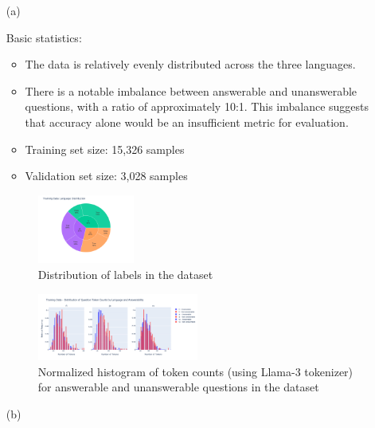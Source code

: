 \documentclass[11pt]{article}
\begin{document}
\begin{enumerate}
    \item[(a)] 

    Basic statistics:
    \begin{itemize}
        \item The data is relatively evenly distributed across the three languages.
        \item There is a notable imbalance between answerable and unanswerable questions, with a ratio of approximately 10:1. This imbalance suggests that accuracy alone would be an insufficient metric for evaluation.
        \item Training set size: 15,326 samples
        \item Validation set size: 3,028 samples
    \end{itemize}

    \begin{figure}[ht]
        \centering
        \includegraphics[width=0.3\textwidth]{week1_a_dataset.png}
        \caption{Distribution of labels in the dataset}
        \label{fig:label_distribution}
    \end{figure}

    \begin{figure}[ht]
        \centering
        \includegraphics[width=0.5\textwidth]{week1_a_lang_token_distribution_normalized.png}
        \caption{Normalized histogram of token counts (using Llama-3 tokenizer) for answerable and unanswerable questions in the dataset}
        \label{fig:language_distribution}
    \end{figure}

    \item[(b)] 


\end{enumerate}
\end{document}
